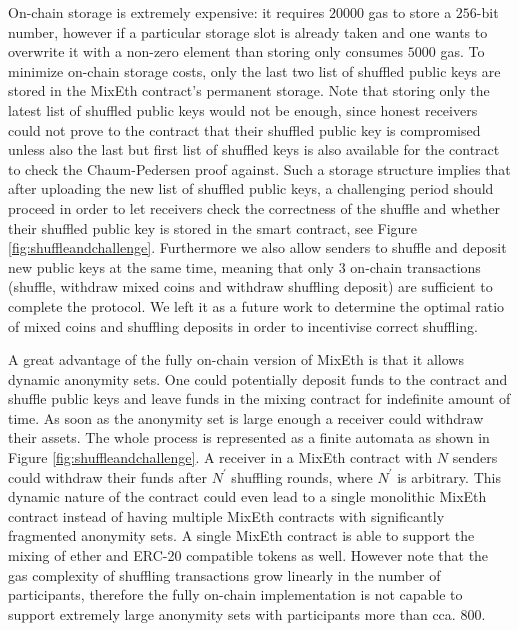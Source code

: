 \documentclass[a4paper]{article}
\theoremstyle{definition}
\begin{document}
On-chain storage is extremely expensive: it requires $\num[group-separator={,}]{20000}$ gas to store a $256$-bit number, however if a particular storage slot is already taken and one wants to overwrite it with a non-zero element than storing only consumes $\num[group-separator={,}]{5000}$ gas. To minimize on-chain storage costs, only the last two list of shuffled public keys are stored in the MixEth contract's permanent storage. Note that storing only the latest list of shuffled public keys would not be enough, since honest receivers could not prove to the contract that their shuffled public key is compromised unless also the last but first list of shuffled keys is also available for the contract to check the Chaum-Pedersen proof against. Such a storage structure implies that after uploading the new list of shuffled public keys, a challenging period should proceed in order to let receivers check the correctness of the shuffle and whether their shuffled public key is stored in the smart contract, see Figure \ref{fig:shuffleandchallenge}. Furthermore we also allow senders to shuffle and deposit new public keys at the same time, meaning that only $3$ on-chain transactions (shuffle, withdraw mixed coins and withdraw shuffling deposit) are sufficient to complete the protocol. We left it as a future work to determine the optimal ratio of mixed coins and shuffling deposits in order to incentivise correct shuffling.

A great advantage of the fully on-chain version of MixEth is that it allows dynamic anonymity sets. One could potentially deposit funds to the contract and shuffle public keys and leave funds in the mixing contract for indefinite amount of time. As soon as the anonymity set is large enough a receiver could withdraw their assets. The whole process is represented as a finite automata as shown in Figure \ref{fig:shuffleandchallenge}. A receiver in a MixEth contract with $N$ senders could withdraw their funds after $N^{'}$ shuffling rounds, where $N^{'}$ is arbitrary.  This dynamic nature of the contract could even lead to a single monolithic MixEth contract instead of having multiple MixEth contracts with significantly fragmented anonymity sets. A single MixEth contract is able to support the mixing of ether and ERC-20 compatible tokens as well. However note that the gas complexity of shuffling transactions grow linearly in the number of participants, therefore the fully on-chain implementation is not capable to support extremely large anonymity sets with participants more than cca. $\num[group-separator={,}]{800}$. 
\end{document}
